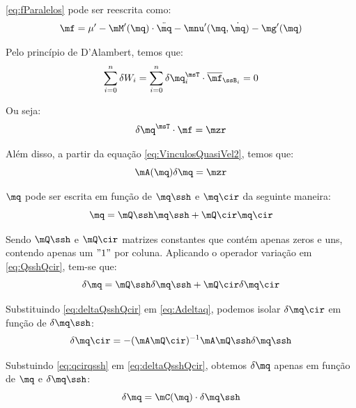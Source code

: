 \documentclass[]{politex}
\begin{document}
\eqref{eq:fParalelos} pode ser reescrita como:
\begin{equation}
\mf = \mu' - \mM'(\mq) \cdot \ddot{\mq} - \mnu'(\mq,\dot{\mq}) - \mg'(\mq)
\end{equation}

Pelo princípio de D'Alambert, temos que:
\begin{equation}
\sum_{i=0}^n \delta W_i = \sum_{i=0}^n \delta \mq_i^\msT \cdot \overline{\mf}_{\ssB_i} = 0
\end{equation}

Ou seja:
\begin{equation} \label{eq:DAlambertParalelos}
\delta \mq^\msT \cdot \mf = \mzr
\end{equation}

Além disso, a partir da equação \eqref{eq:VinculosQuasiVel2}, temos que:
\begin{equation} \label{eq:Adeltaq}
\mA(\mq) \delta \mq = \mzr
\end{equation}

$\mq$ pode ser escrita em função de $\mq\ssh$ e $\mq\cir$ da seguinte maneira:
\begin{equation} \label{eq:QsshQcir}
\mq = \mQ\ssh \mq\ssh + \mQ\cir \mq\cir
\end{equation}

Sendo $\mQ\ssh$ e $\mQ\cir$ matrizes constantes que contém apenas zeros e uns, contendo apenas um $"1"$ por coluna.
Aplicando o operador variação em \eqref{eq:QsshQcir}, tem-se que:
\begin{equation} \label{eq:deltaQsshQcir}
\delta\mq = \mQ\ssh \delta\mq\ssh + \mQ\cir \delta\mq\cir
\end{equation}

Substituindo \eqref{eq:deltaQsshQcir} em \eqref{eq:Adeltaq}, podemos isolar $\delta\mq\cir$ em função de $\delta\mq\ssh$:
\begin{equation} \label{eq:qcirqssh}
\delta\mq\cir = -(\mA \mQ\cir)^{-1} \mA \mQ\ssh \delta \mq\ssh
\end{equation}

Substuindo \eqref{eq:qcirqssh} em \eqref{eq:deltaQsshQcir}, obtemos $\delta\mq$ apenas em função de $\mq$ e $\delta\mq\ssh$:
\begin{equation} \label{eq:deltamqC}
\delta \mq = \mC(\mq) \cdot \delta\mq\ssh
\end{equation}
\end{document}
